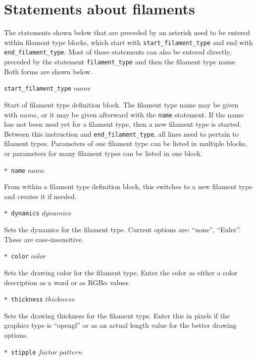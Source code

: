 \documentclass {scrbook}
\newcommand {\ttt} {\texttt}
\begin{document}
\section{Statements about filaments}

The statements shown below that are preceded by an asterisk need to be entered within filament type blocks, which start with \ttt{start\_filament\_type} and end with \ttt{end\_filament\_type}. Most of these statements can also be entered directly, preceded by the statement \ttt{filament\_type} and then the filament type name. Both forms are shown below.

\begin{description}

\item{\ttt{start\_filament\_type} $name$}

Start of filament type definition block. The filament type name may be given with $name$, or it may be given afterward with the \ttt{name} statement. If the name has not been used yet for a filament type, then a new filament type is started. Between this instruction and \ttt{end\_filament\_type}, all lines need to pertain to filament types. Parameters of one filament type can be listed in multiple blocks, or parameters for many filament types can be listed in one block.

\item{\ttt{* name} $name$}

From within a filament type definition block, this switches to a new filament type and creates it if needed.

\item{\ttt{* dynamics} $dynamics$}

Sets the dynamics for the filament type. Current options are: ``none'', ``Euler''. These are case-insensitive.

\item{\ttt{* color} $color$}

Sets the drawing color for the filament type. Enter the color as either a color description as a word or as RGB$\alpha$ values.

\item{\ttt{* thickness} $thickness$}

Sets the drawing thickness for the filament type. Enter this in pixels if the graphics type is ``opengl'' or as an actual length value for the better drawing options.

\item{\ttt{* stipple} $factor$ $pattern$}


\end{description}
\end{document}
